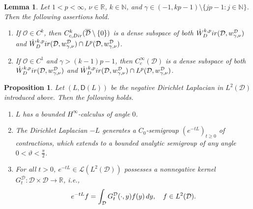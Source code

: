 \documentclass[10pt,a4paper]{amsart}
\newtheorem{lemma}{Lemma}
\newtheorem{proposition}{Proposition}
\newcommand{\Dir}{\textup{Dir}}
\newcommand{\N}{\ensuremath{\mathbb{N}}}
\newcommand{\R}{\ensuremath{\mathbb{R}}}
\newcommand{\calD}{\ensuremath{\mathcal{D}}}
\newcommand{\calO}{\ensuremath{\mathcal{O}}}
\newcommand{\dd}{\textup{d}}
\newcommand{\sL}{\ensuremath{\mathscr{L}}}
\newcommand{\sfD}{\ensuremath{\mathsf{D}}}
\begin{document}
\begin{lemma}\label{lem:smooth:dense}
Let $1<p<\infty$, $\nu\in\R$, $k\in\N$, and $\gamma\in(-1,kp-1)\setminus\{jp-1\colon j\in\N\}$. Then the following assertions hold.
\begin{enumerate}[label=\textup{(\roman*)}]
    \item\label{it:smooth:dense:Dir} If $\calO \in C^k$, then $C_{c,\Dir}^k(\overline{\calD}\setminus\{0\})$ is a dense subspace of both $\Dot{W}^{k,p}_\Dir(\calD,w_{\gamma,\nu}^\calD)$ and $\Dot{W}^{k,p}_\Dir(\calD,w_{\gamma,\nu}^\calD)\cap L^p(\calD,w_{\gamma,\nu}^\calD)$.
    \item\label{it:smooth:dense:test} If $\calO \in C^1$ and $\gamma>(k-1)p-1$, then $C_c^\infty(\calD)$ is a dense subspace of both $\Dot{W}^{k,p}_\Dir(\calD,w_{\gamma,\nu}^\calD)$ and $\Dot{W}^{k,p}_\Dir(\calD,w_{\gamma,\nu}^\calD)\cap L^p(\calD,w_{\gamma,\nu}^\calD)$.
\end{enumerate}
\end{lemma}

    \begin{proposition}\label{functionalcalculus:variationalsetting}
      Let $(L,\sfD(L))$ be the negative Dirichlet Laplacian in $L^2(\calD)$ introduced above. Then the following holds. 
    \begin{enumerate}[label=\textup{(\roman*)}]
        \item\label{it:L:calculus} $L$ has a bounded $H^\infty$-calculus of angle $0$.
        \item\label{it:L:semigroup} The Dirichlet Laplacian $-L$ generates a $C_0$-semigroup $(e^{-tL})_{t\geq 0}$ of contractions, which extends to a bounded analytic semigroup of any angle $0<\vartheta <\frac{\pi}{2}$.
        \item\label{it:L:kernel} For all $t>0$, $e^{-tL}\in\sL(L^2(\calD))$ possesses a nonnegative kernel 
        $G_t^\calD\colon\calD\times\calD\to\R$, i.e.,
        \[
        e^{-tL}f = \int_\calD G_t^\calD(\cdot,y)f(y)\,\dd y, \quad f\in L^2(\calD). 
        \]
    \end{enumerate}
    \end{proposition}
\end{document}
